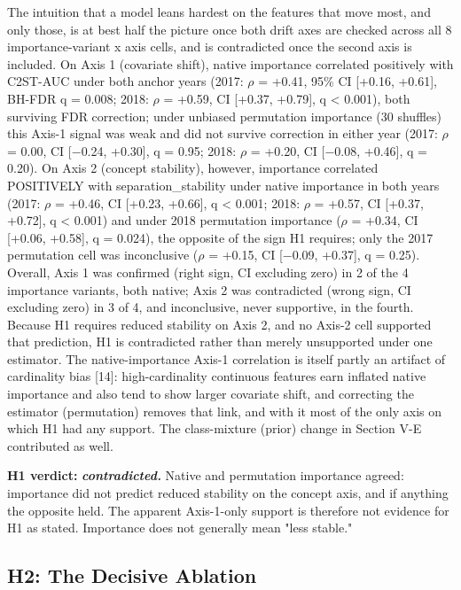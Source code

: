 \documentclass[conference]{IEEEtran}
\begin{document}
The intuition that a model leans hardest on the features that move most, and only those, is at best half the picture once both drift axes are checked across all 8 importance-variant x axis cells, and is contradicted once the second axis is included. On Axis 1 (covariate shift), native importance correlated positively with C2ST-AUC under both anchor years (2017: $\rho$ = +0.41, 95\% CI [+0.16, +0.61], BH-FDR q = 0.008; 2018: $\rho$ = +0.59, CI [+0.37, +0.79], q < 0.001), both surviving FDR correction; under unbiased permutation importance (30 shuffles) this Axis-1 signal was weak and did not survive correction in either year (2017: $\rho$ = 0.00, CI [$-$0.24, +0.30], q = 0.95; 2018: $\rho$ = +0.20, CI [$-$0.08, +0.46], q = 0.20). On Axis 2 (concept stability), however, importance correlated POSITIVELY with separation\_\allowbreak{}stability under native importance in both years (2017: $\rho$ = +0.46, CI [+0.23, +0.66], q < 0.001; 2018: $\rho$ = +0.57, CI [+0.37, +0.72], q < 0.001) and under 2018 permutation importance ($\rho$ = +0.34, CI [+0.06, +0.58], q = 0.024), the opposite of the sign H1 requires; only the 2017 permutation cell was inconclusive ($\rho$ = +0.15, CI [$-$0.09, +0.37], q = 0.25). Overall, Axis 1 was confirmed (right sign, CI excluding zero) in 2 of the 4 importance variants, both native; Axis 2 was contradicted (wrong sign, CI excluding zero) in 3 of 4, and inconclusive, never supportive, in the fourth. Because H1 requires reduced stability on Axis 2, and no Axis-2 cell supported that prediction, H1 is contradicted rather than merely unsupported under one estimator. The native-importance Axis-1 correlation is itself partly an artifact of cardinality bias [14]: high-cardinality continuous features earn inflated native importance and also tend to show larger covariate shift, and correcting the estimator (permutation) removes that link, and with it most of the only axis on which H1 had any support. The class-mixture (prior) change in Section V-E contributed as well.
\par\medskip

\textbf{H1 verdict: }\textbf{\textit{contradicted. }}Native and permutation importance agreed: importance did not predict reduced stability on the concept axis, and if anything the opposite held. The apparent Axis-1-only support is therefore not evidence for H1 as stated. Importance does not generally mean "less stable."\par\medskip

\subsection{H2: The Decisive Ablation}
\end{document}
